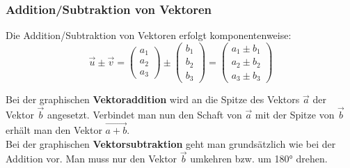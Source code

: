 \subsubsection{Addition/Subtraktion von Vektoren}
Die Addition/Subtraktion von Vektoren erfolgt komponentenweise:
\begin{equation}
\vec{u} \pm \vec{v} = 
\begin{pmatrix} a_1 \\ a_2 \\ a_3 \end{pmatrix} \pm
\begin{pmatrix} b_1 \\ b_2 \\ b_3 \end{pmatrix} =
\begin{pmatrix} a_1 \pm b_1 \\ a_2 \pm b_2 \\ a_3 \pm b_3\end{pmatrix}
\end{equation}
\noindent
\begin{minipage}[c]{0.6\textwidth}
Bei der graphischen \textbf{Vektoraddition} wird an die Spitze des Vektors $\vec{a}$ der Vektor $\vec{b}$ angesetzt. Verbindet man nun den Schaft von $\vec{a}$ mit der Spitze von $\vec{b}$ erhält man den Vektor $\vec{a+b}$. \\
Bei der graphischen \textbf{Vektorsubtraktion} geht man grundsätzlich wie bei der Addition vor. Man muss nur den Vektor $\vec{b}$ umkehren bzw. um 180° drehen.
\end{minipage}
\hspace{0.05\textwidth}
\begin{minipage}[c]{0.35\textwidth}
\end{minipage}

